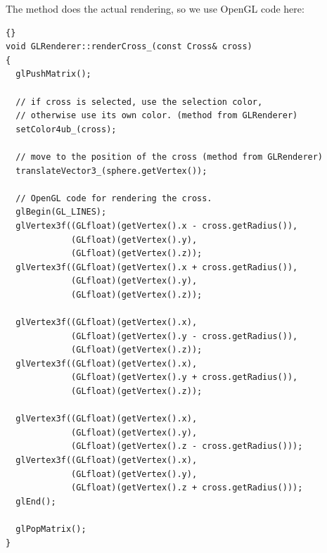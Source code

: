 The method 
does the actual rendering, so we use OpenGL code here:

\begin{lstlisting}{}
void GLRenderer::renderCross_(const Cross& cross)
{
  glPushMatrix();
	
  // if cross is selected, use the selection color,
  // otherwise use its own color. (method from GLRenderer)
  setColor4ub_(cross);  
	
  // move to the position of the cross (method from GLRenderer)
  translateVector3_(sphere.getVertex());
	
  // OpenGL code for rendering the cross.
  glBegin(GL_LINES);
  glVertex3f((GLfloat)(getVertex().x - cross.getRadius()),
             (GLfloat)(getVertex().y),
             (GLfloat)(getVertex().z));
  glVertex3f((GLfloat)(getVertex().x + cross.getRadius()),
             (GLfloat)(getVertex().y),
             (GLfloat)(getVertex().z));

  glVertex3f((GLfloat)(getVertex().x),
             (GLfloat)(getVertex().y - cross.getRadius()),
             (GLfloat)(getVertex().z));
  glVertex3f((GLfloat)(getVertex().x),
             (GLfloat)(getVertex().y + cross.getRadius()),
             (GLfloat)(getVertex().z));

  glVertex3f((GLfloat)(getVertex().x),
             (GLfloat)(getVertex().y),
             (GLfloat)(getVertex().z - cross.getRadius()));
  glVertex3f((GLfloat)(getVertex().x),
             (GLfloat)(getVertex().y),
             (GLfloat)(getVertex().z + cross.getRadius()));
  glEnd();

  glPopMatrix();
}
\end{lstlisting}


